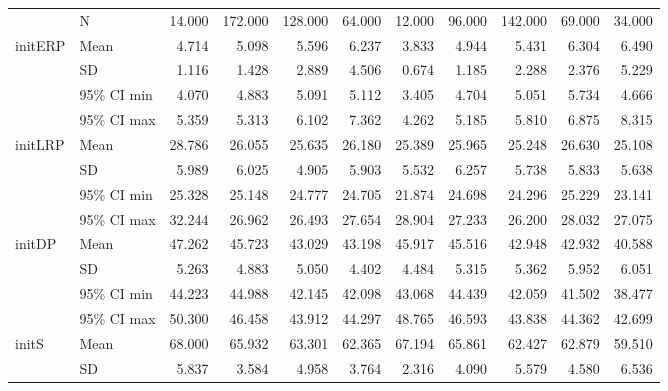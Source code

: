 \begin{longtable}{llrrrrrrrrr}
\bottomrule
\endlastfoot
{} & N &     14.000 &    172.000 &    128.000 &     64.000 &     12.000 &     96.000 &    142.000 &     69.000 &     34.000 \\
\multirow{4}{*}{initERP} & Mean &      4.714 &      5.098 &      5.596 &      6.237 &      3.833 &      4.944 &      5.431 &      6.304 &      6.490 \\
   & SD &      1.116 &      1.428 &      2.889 &      4.506 &      0.674 &      1.185 &      2.288 &      2.376 &      5.229 \\
   & 95\% CI min &      4.070 &      4.883 &      5.091 &      5.112 &      3.405 &      4.704 &      5.051 &      5.734 &      4.666 \\
   & 95\% CI max &      5.359 &      5.313 &      6.102 &      7.362 &      4.262 &      5.185 &      5.810 &      6.875 &      8.315 \\
\cline{1-11}
\multirow{4}{*}{initLRP} & Mean &     28.786 &     26.055 &     25.635 &     26.180 &     25.389 &     25.965 &     25.248 &     26.630 &     25.108 \\
   & SD &      5.989 &      6.025 &      4.905 &      5.903 &      5.532 &      6.257 &      5.738 &      5.833 &      5.638 \\
   & 95\% CI min &     25.328 &     25.148 &     24.777 &     24.705 &     21.874 &     24.698 &     24.296 &     25.229 &     23.141 \\
   & 95\% CI max &     32.244 &     26.962 &     26.493 &     27.654 &     28.904 &     27.233 &     26.200 &     28.032 &     27.075 \\
\cline{1-11}
\multirow{4}{*}{initDP} & Mean &     47.262 &     45.723 &     43.029 &     43.198 &     45.917 &     45.516 &     42.948 &     42.932 &     40.588 \\
   & SD &      5.263 &      4.883 &      5.050 &      4.402 &      4.484 &      5.315 &      5.362 &      5.952 &      6.051 \\
   & 95\% CI min &     44.223 &     44.988 &     42.145 &     42.098 &     43.068 &     44.439 &     42.059 &     41.502 &     38.477 \\
   & 95\% CI max &     50.300 &     46.458 &     43.912 &     44.297 &     48.765 &     46.593 &     43.838 &     44.362 &     42.699 \\
\cline{1-11}
\multirow{4}{*}{initS} & Mean &     68.000 &     65.932 &     63.301 &     62.365 &     67.194 &     65.861 &     62.427 &     62.879 &     59.510 \\
   & SD &      5.837 &      3.584 &      4.958 &      3.764 &      2.316 &      4.090 &      5.579 &      4.580 &      6.536 \\

\end{longtable}
